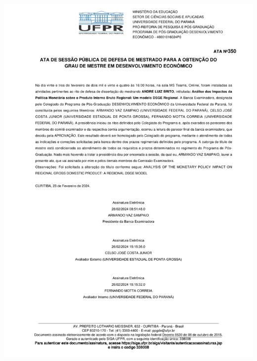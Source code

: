 \documentclass[../thesis.tex]{subfiles}
\begin{document}
{\noindent
	
	{\centering
		
		\includegraphics[scale=0.85]{../docs/ata_da_defesa.pdf}
		
	}
	
}

\thispagestyle{empty}	
\end{document}
